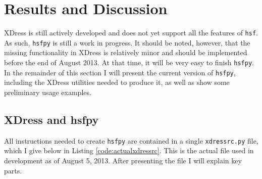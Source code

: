 
\section{Results and Discussion} \label{sec:results_and_discussion}

XDress is still actively developed and does not yet support all the features of \texttt{hsf}. As such, \texttt{hsfpy} is still a work in progress. It should be noted, however, that the missing functionality in XDress is relatively minor and should be implemented before the end of August 2013. At that time, it will be very easy to finish \texttt{hsfpy}. In the remainder of this section I will present the current version of \texttt{hsfpy}, including the XDress utilities needed to produce it, as well as show some preliminary usage examples.

\subsection{XDress and hsfpy} \label{sub:xdress_and_hsfpy}

  All instructions needed to create \texttt{hsfpy} are contained in a single \texttt{xdressrc.py} file, which I give below in Listing \ref{code:actualxdressrc}. This is the actual file used in development as of August 5, 2013. After presenting the file I will explain key parts.

  \vspace{.2in}
  

